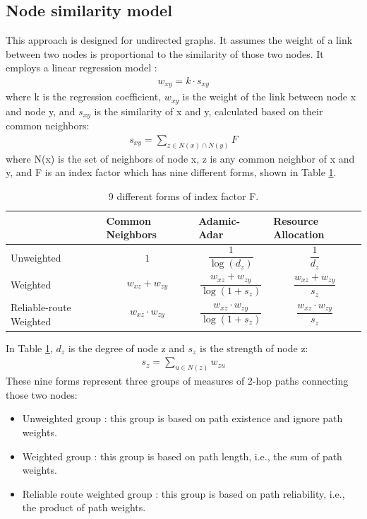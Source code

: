 \documentclass[conference]{IEEEtran}
\begin{document}
\subsection{Node similarity model}
This approach is designed for undirected graphs.
It assumes the weight of a link between two nodes 
is proportional to the similarity of those two nodes.
It employs a linear regression model \cite{zhao2015prediction}:
\begin{align*}
	w_{xy} = k \cdot s_{xy}
\end{align*}
where k is the regression coefficient,
$ w_{xy} $ is the weight of the link between node x and node y,
and $ s_{xy} $ is the similarity of x and y, calculated based on their common neighbors:
\begin{align*}
	s_{xy} = \sum_{z \in N(x) \cap N(y)} F
\end{align*}
where N(x) is the set of neighbors of node x, z is any common neighbor of x and y,
and F is an index factor which has nine different forms, shown in Table \ref{tab:indexes}.
\begin{table}[!htb]\centering
	\caption{9 different forms of index factor F.}
	\begin{tabularx}{0.45\textwidth}{|>{\columncolor{blue!40}}X|X|X|X|}  \hline \rowcolor{blue!40}
		& Common Neighbors & Adamic-Adar & Resource Allocation \\ \hline
		Unweighted &
		\[1\] &
		\[\frac{1}{\log(d_z)}\] &
		\[\frac{1}{d_z}\] \\ \hline
		Weighted &
		\[w_{xz} + w_{zy}\] &
		\[\frac{w_{xz} + w_{zy}}{\log(1 + s_z)}\] &
		\[\frac{w_{xz} + w_{zy}}{s_z}\] \\ \hline
		Reliable-route Weighted &
		\[ w_{xz} \cdot w_{zy}\] &
		\[\frac{w_{xz} \cdot w_{zy}}{\log(1 + s_z)}\] &
		\[\frac{w_{xz} \cdot w_{zy}}{s_z}\] \\ \hline
	\end{tabularx}
	\label{tab:indexes}
\end{table}
In Table \ref{tab:indexes}, $ d_z $ is the degree of node z and $ s_z $ is the strength of node z:
\begin{align*}
s_z = \sum_{u \in N(z)} w_{zu}
\end{align*}
These nine forms represent three groups of measures of 2-hop paths connecting those two nodes:
\begin{itemize}
	\item Unweighted group \cite{adamic2003friends}:
	this group is based on path existence and ignore path weights.
	\item Weighted group \cite{murata2007link}:
	this group is based on path length, i.e., the sum of path weights.
	\item Reliable route weighted group \cite{taha1982operations}:
	this group is based on path reliability, i.e., the product of path weights.
\end{itemize}
\end{document}
